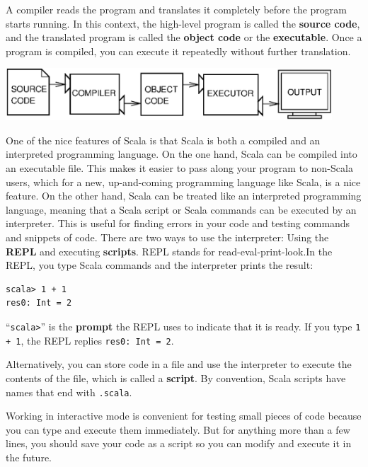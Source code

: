 \documentclass[10pt]{book}
\begin{document}

A compiler reads the program and translates it completely before the program 
starts running.  In this context, the high-level program is called the {\bf source 
code}, and the translated program is called the {\bf object code} or the {\bf executable}.  
Once a program is compiled, you can execute it repeatedly without further translation.

\beforefig
\centerline{\includegraphics[height=0.77in]{figs/compile.eps}}
\afterfig

One of the nice features of Scala is that Scala is both a compiled and an interpreted 
programming language. On the one hand, Scala can be compiled into an executable file. 
This makes it easier to pass along your program to non-Scala users, which for a new, 
up-and-coming programming language like Scala, is a nice feature. On the other hand, 
Scala can be treated like an interpreted programming language, meaning that a Scala 
script or Scala commands can be executed by an interpreter. This is useful for finding 
errors in your code and testing commands and snippets of code. There are two ways to use 
the interpreter: Using the {\bf REPL} and executing {\bf scripts}. REPL stands for
read-eval-print-look.In the REPL, you type Scala commands and the interpreter prints the
result:


\beforeverb
\begin{verbatim}
scala> 1 + 1
res0: Int = 2
\end{verbatim}
\afterverb
%
``{\tt scala>}'' is the {\bf prompt} the REPL uses to indicate that it is 
ready. If you type {\tt 1 + 1}, the 
REPL replies {\tt res0: Int = 2}.


Alternatively, you can store code in a file and use the interpreter to execute the contents 
of the file, which is called a {\bf script}.  By convention, Scala scripts have names that 
end with {\tt .scala}.



Working in interactive mode is convenient for testing small pieces of code because you can type 
and execute them immediately.  But for anything more than a few lines, you should save your code 
as a script so you can modify and execute it in the future.
\end{document}
